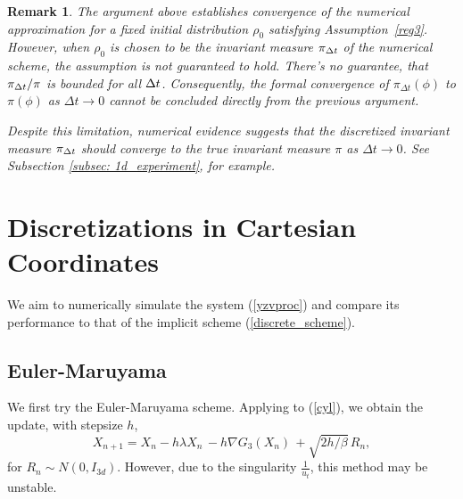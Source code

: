 \documentclass[11pt, twoside]{report}
\newtheorem{remark}{Remark}[theorem]
\begin{document}
\begin{remark}
    The argument above establishes convergence of the numerical approximation for a fixed initial distribution $\rho_0$ satisfying Assumption~\ref{reg3}. However, when $\rho_0$ is chosen to be the invariant measure $\pi_{{\Delta t}}$ of the numerical scheme, the assumption is not guaranteed to hold. There's no guarantee, that $\pi_{{\Delta t}} / \pi$ is bounded for all ${\Delta t}$. Consequently, the formal convergence of $\pi_{\Delta t}(\phi)$ to $\pi(\phi)$ as $\Delta t \to 0$ cannot be concluded directly from the previous argument. 

Despite this limitation, numerical evidence suggests that the discretized invariant measure $\pi_{{\Delta t}}$ should converge to the true invariant measure $\pi$ as $\Delta t \to 0$. See Subsection \ref{subsec: 1d_experiment}, for example.
\end{remark}

\section{Discretizations in Cartesian Coordinates}
We aim to numerically simulate the system (\ref{yzvproc}) and compare its performance to that of the implicit scheme (\ref{discrete_scheme}). 
\subsection{Euler-Maruyama}
We first try the Euler-Maruyama scheme. Applying to (\ref{cyl}), we obtain the update, with stepsize $h$,
\[X_{n+1} = X_n - h\lambda X_n \, - h\nabla G_{3}(X_n)\, + \sqrt{2h/\beta}\,R_n,\]
for $R_n \sim N(0,I_{3d})$. However, due to the singularity $\frac{1}{u_t}$, this method may be unstable.
\end{document}
